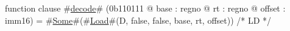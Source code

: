function clause #\hyperref[zdecode]{decode}# (0b110111 @ base : regno @ rt : regno @ offset : imm16) =
  #\hyperref[zSome]{Some}#(#\hyperref[zLoad]{Load}#(D, false, false, base, rt, offset)) /* LD */
